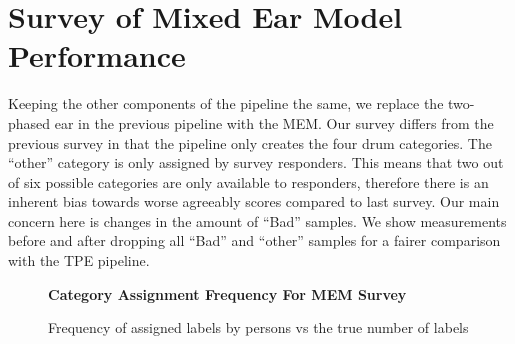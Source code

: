 \documentclass[\main/thesis.tex]{subfiles}
\begin{document}
 \section{Survey of Mixed Ear Model Performance}
 Keeping the other components of the pipeline the same, we replace the two-phased ear in the previous pipeline with the MEM. Our survey differs from the previous survey in that the pipeline only creates the four drum categories. The \enquote{other} category is only assigned by survey responders. This means that two out of six possible categories are only available to responders, therefore there is an inherent bias towards worse agreeably scores compared to last survey. Our main concern here is changes in the amount of \enquote{Bad} samples. We show measurements before and after dropping all \enquote{Bad} and \enquote{other} samples for a fairer comparison with the TPE pipeline.

 \begin{table}[t]
\caption{\label{kappa_table_MEM}Table of Fleiss' kappa coefficient to measure the degree of agreement between persons (HvH) and persons and MEM. We measure the agreeability scores after dropping bad samples if both or either persons assigned the sample as such. We also measure agree-ability when all samples deemed \enquote{Bad} or \enquote{other} by either person are removed.}
\end{table}

\begin{figure}[htpb]
    \begin{center}
    \textbf{Category Assignment Frequency For MEM Survey}
    \end{center}
    \caption{Frequency of assigned labels by persons vs the true number of labels}
\label{fig:freq-survey-2p}
\end{figure} 
\end{document}
